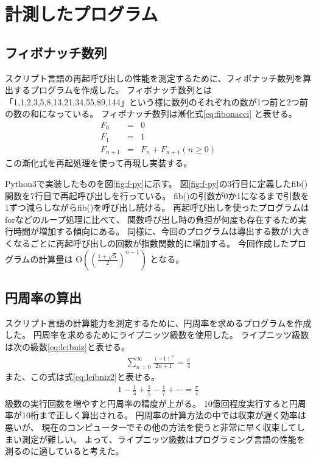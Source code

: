 \chapter{計測したプログラム}
\label{cha:program}
\section{フィボナッチ数列}
スクリプト言語の再起呼び出しの性能を測定するために、フィボナッチ数列を算出するプログラムを作成した。
フィボナッチ数列とは「1,1,2,3,5,8,13,21,34,55,89,144」という様に数列のそれぞれの数が1つ前と2つ前の数の和になっている。
フィボナッチ数列は漸化式\ref{eq:fibonacci} と表せる。
\begin{eqnarray} \label{eq:fibonacci}
  F_{0}&=&0 \nonumber \\
  F_{1}&=&1 \\
  F_{n+1}&=&F_{n}+F_{n+1}(n≥0)\nonumber
\end{eqnarray}
この漸化式を再起処理を使って再現し実装する。

Python3で実装したものを図\ref{fig:f-py}に示す。
図\ref{fig:f-py}の3行目に定義したfib()関数を7行目で再起呼び出しを行っている。
fib()の引数が0か1になるまで引数を1ずつ減らしながらfib()を呼び出し続ける。
再起呼び出しを使ったプログラムはforなどのループ処理に比べて、
関数呼び出し時の負担が何度も存在するため実行時間が増加する傾向にある。
同様に、今回のプログラムは導出する数が1大きくなるごとに再起呼び出しの回数が指数関数的に増加する。
今回作成したプログラムの計算量は O$((\frac{1 +\sqrt{5}}{2})^{n-1})$ となる。

\section{円周率の算出}
スクリプト言語の計算能力を測定するために、円周率を求めるプログラムを作成した。
円周率を求めるためにライプニッツ級数を使用した。
ライプニッツ級数は次の級数\ref{eq:leibniz}と表せる。
\begin{eqnarray} \label{eq:leibniz}
\sum_{n=0}^{\infty}\frac{(-1)^n}{2n+1}=\frac{\pi}{4}
\end{eqnarray}
また、この式は式\ref{eq:leibniz2}と表せる。
\begin{eqnarray} \label{eq:leibniz2}
1-\frac{1}{3}+\frac{1}{5}-\frac{1}{7}+\cdots=\frac{\pi}{4}
\end{eqnarray}
級数の実行回数を増やすと円周率の精度が上がる。
10億回程度実行すると円周率が10桁まで正しく算出される。
円周率の計算方法の中では収束が遅く効率は悪いが、
現在のコンピューターでその他の方法を使うと非常に早く収束してしまい測定が難しい。
よって、ライプニッツ級数はプログラミング言語の性能を測るのに適していると考えた。

